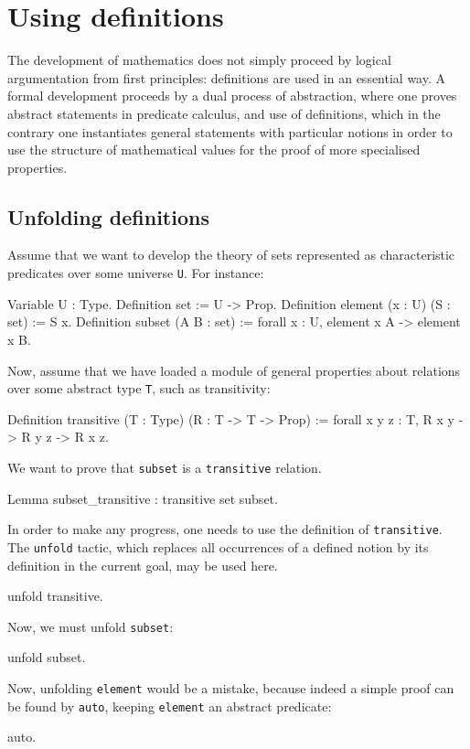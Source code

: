 \documentclass[11pt,a4paper]{book}
\begin{document}
\section{Using definitions}

The development of mathematics does not simply proceed by logical
argumentation from first principles: definitions are used in an essential way.
A formal development proceeds by a dual process of abstraction, where one
proves abstract statements in predicate calculus, and use of definitions,
which in the contrary one instantiates general statements with particular
notions in order to use the structure of mathematical values for the proof of
more specialised properties.

\subsection{Unfolding definitions}

Assume that we want to develop the theory of sets represented as characteristic
predicates over some universe \verb:U:. For instance:
\begin{coq_example}
Variable U : Type.
Definition set := U -> Prop.
Definition element (x : U) (S : set) := S x.
Definition subset (A B : set) :=
  forall x : U, element x A -> element x B.
\end{coq_example}

Now, assume that we have loaded a module of general properties about
relations over some abstract type \verb:T:, such as transitivity:

\begin{coq_example}
Definition transitive (T : Type) (R : T -> T -> Prop) :=
  forall x y z : T, R x y -> R y z -> R x z.
\end{coq_example}

We want to prove that \verb:subset: is a \verb:transitive:
relation.
\begin{coq_example}
Lemma subset_transitive : transitive set subset.
\end{coq_example}

In order to make any progress, one needs to use the definition of
\verb:transitive:. The \verb:unfold: tactic, which replaces all
occurrences of a defined notion by its definition in the current goal,
may be used here.
\begin{coq_example}
unfold transitive.
\end{coq_example}

Now, we must unfold \verb:subset::
\begin{coq_example}
unfold subset.
\end{coq_example}
Now, unfolding \verb:element: would be a mistake, because indeed a simple proof
can be found by \verb:auto:, keeping \verb:element: an abstract predicate:
\begin{coq_example}
auto.
\end{coq_example}
\end{document}
